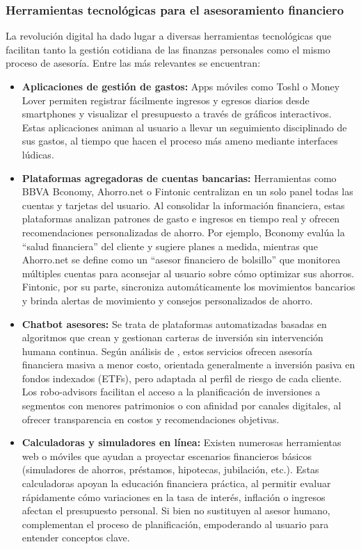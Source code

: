 \subsubsection*{Herramientas tecnológicas para el asesoramiento financiero}
La revolución digital ha dado lugar a diversas herramientas tecnológicas que facilitan tanto la gestión cotidiana de las finanzas personales como el mismo proceso de asesoría. Entre las más relevantes se encuentran:

\begin{itemize}
	\item \textbf{Aplicaciones de gestión de gastos:} Apps móviles como Toshl o Money Lover permiten registrar fácilmente ingresos y egresos diarios desde smartphones y visualizar el presupuesto a través de gráficos interactivos. Estas	aplicaciones animan al usuario a llevar un seguimiento disciplinado de sus gastos, al tiempo que hacen el proceso más ameno mediante interfaces lúdicas.
	\item \textbf{Plataformas agregadoras de cuentas bancarias:} Herramientas como BBVA Bconomy, Ahorro.net o Fintonic centralizan en un solo panel todas las cuentas y tarjetas del usuario. Al consolidar la información financiera, estas plataformas analizan patrones de gasto e ingresos en tiempo real y ofrecen recomendaciones personalizadas de ahorro. Por ejemplo, Bconomy evalúa la ``salud financiera'' del cliente y sugiere planes a medida, mientras que Ahorro.net se define como un ``asesor financiero de bolsillo'' que monitorea múltiples cuentas para aconsejar al usuario sobre cómo optimizar sus ahorros. Fintonic, por su parte, sincroniza automáticamente los movimientos bancarios y brinda alertas de movimiento y consejos personalizados de ahorro.
	
	\item \textbf{Chatbot asesores:} Se trata de plataformas automatizadas basadas en algoritmos que crean y gestionan carteras de inversión sin intervención humana continua. Según análisis de \textcite{BBVAResearch01}, estos servicios ofrecen asesoría financiera masiva a menor costo, orientada generalmente a inversión pasiva en fondos indexados (ETFs), pero adaptada al perfil de riesgo de cada cliente. Los robo-advisors facilitan el acceso a la planificación de inversiones a segmentos con menores patrimonios o con afinidad por canales digitales, al ofrecer transparencia en costos y recomendaciones objetivas.
	\item \textbf{Calculadoras y simuladores en línea:} Existen numerosas herramientas web o móviles que ayudan a proyectar escenarios financieros básicos (simuladores de ahorros, préstamos, hipotecas, jubilación, etc.). Estas calculadoras apoyan la educación financiera práctica, al permitir evaluar rápidamente cómo variaciones en la tasa de interés, inflación o ingresos afectan el presupuesto personal. Si bien no sustituyen al asesor humano, complementan el proceso de planificación, empoderando al usuario para entender conceptos clave.
\end{itemize}

